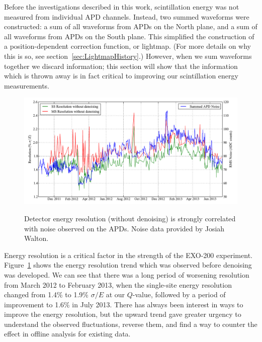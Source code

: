 Before the investigations described in this work, scintillation energy was not measured from individual APD channels.  Instead, two summed waveforms were constructed: a sum of all waveforms from APDs on the North plane, and a sum of all waveforms from APDs on the South plane.  This simplified the construction of a position-dependent correction function, or lightmap.  (For more details on why this is so, see section~\ref{sec:LightmapHistory}.)  However, when we sum waveforms together we discard information; this section will show that the information which is thrown away is in fact critical to improving our scintillation energy measurements.

\begin{figure}
\begin{center}
\includegraphics[keepaspectratio=true,width=\textwidth]{ResolutionAPDNoiseComparison.pdf}
\end{center}
\renewcommand{\baselinestretch}{1}
\small\normalsize
\begin{quote}
\caption{Detector energy resolution (without denoising) is strongly correlated with noise observed on the APDs.  Noise data provided by Josiah Walton.}
\label{fig:ResolutionAPDNoiseComparison}
\end{quote}
\end{figure}
\renewcommand{\baselinestretch}{2}
\small\normalsize

Energy resolution is a critical factor in the strength of the EXO-200 experiment.  Figure~\ref{fig:ResolutionAPDNoiseComparison} shows the energy resolution trend which was observed before denoising was developed.  We can see that there was a long period of worsening resolution from March 2012 to February 2013, when the single-site energy resolution changed from 1.4\% to 1.9\% $\sigma/E$ at our $Q$-value, followed by a period of improvement to 1.6\% in July 2013.  There has always been interest in ways to improve the energy resolution, but the upward trend gave greater urgency to understand the observed fluctuations, reverse them, and find a way to counter the effect in offline analysis for existing data.

